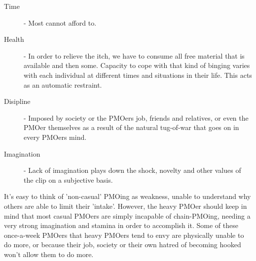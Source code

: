 \documentclass[easypeasy]{subfiles}
\begin{document}
  \begin{description}
  \item [Time] - Most cannot afford to.
  \item [Health] - In order to relieve the itch, we have to consume all free material that is available and then some. Capacity to cope with that kind of binging varies with each individual at different times and situations in their life. This acts as an automatic restraint.
  \item [Disipline] - Imposed by society or the PMOers job, friends and relatives, or even the PMOer themselves as a result of the natural tug-of-war that goes on in every PMOers mind.
  \item [Imagination] - Lack of imagination plays down the shock, novelty and other values of the clip on a subjective basis.
  \end{description}

It's easy to think of 'non-casual' PMOing as weakness, unable to understand why others are able to limit their 'intake'. However, the heavy PMOer should keep in mind that most casual PMOers are simply incapable of chain-PMOing, needing a very strong imagination and stamina in order to accomplish it. Some of these once-a-week PMOers that heavy PMOers tend to envy are physically unable to do more, or because their job, society or their own hatred of becoming hooked won't allow them to do more.
\end{document}
